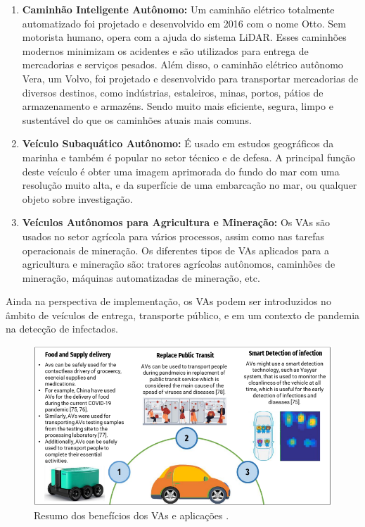 \begin{enumerate}
\item \textbf{Caminhão Inteligente Autônomo:} Um caminhão elétrico totalmente automatizado foi projetado e desenvolvido em 2016 com o nome Otto. Sem motorista humano, opera com a ajuda do sistema LiDAR. Esses caminhões modernos minimizam os acidentes e são utilizados para entrega de mercadorias e serviços pesados. Além disso, o caminhão elétrico autônomo Vera, um Volvo, foi projetado e desenvolvido para transportar mercadorias de diversos destinos, como indústrias, estaleiros, minas, portos, pátios de armazenamento e armazéns. Sendo muito mais eficiente, segura, limpo e sustentável do que os caminhões atuais mais comuns.

\item \textbf{Veículo Subaquático Autônomo:} É usado em estudos geográficos da marinha e também é popular no setor técnico e de defesa. A principal função deste veículo é obter uma imagem aprimorada do fundo do mar com uma resolução muito alta, e da superfície de uma embarcação no mar, ou qualquer objeto sobre investigação.
\item \textbf{Veículos Autônomos para Agricultura e Mineração:}  Os VAs são usados no setor agrícola para vários processos, assim como nas tarefas operacionais de mineração. Os diferentes tipos de VAs aplicados para a agricultura e mineração são: tratores agrícolas autônomos, caminhões de mineração, máquinas automatizadas de mineração, etc.

\end{enumerate}

Ainda na perspectiva de implementação, os VAs podem ser introduzidos no âmbito de veículos de entrega, transporte público, e em um contexto de pandemia na detecção de infectados.

\begin{figure}[H]
\centering
\includegraphics[width=\textwidth]{Figures/aplic.png}
\caption{Resumo dos benefícios dos VAs e aplicações \cite{mundobrasil}.}
\label{resumo_aplic}
\end{figure}

